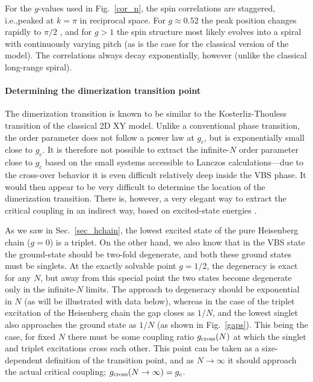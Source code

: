 \documentclass[draft,numberedheadings]{aipproc}
\begin{document}
For the $g$-values used in Fig.~\ref{cor_n}, the spin correlations are staggered, i.e.,peaked at $k=\pi$ in reciprocal space. For $g \approx 0.52$ 
the peak position changes rapidly to $\pi/2$ \cite{bursill96}, and for $g>1$ the spin structure most likely evolves into a spiral with continuously 
varying pitch \cite{kumar} (as is the case for the classical version of the model). The correlations always decay exponentially, however (unlike the
classical long-range spiral).


\paragraph{Determining the dimerization transition point}

The dimerization transition is known to be similar to the Kosterliz-Thouless transition of the classical 2D XY model. Unlike a conventional phase transition, 
the order parameter does not follow a power law at $g_c$, but is exponentially small close to $g_c$. It is therefore not possible to extract the infinite-$N$ 
order parameter close to $g_c$ based on the small systems accessible to Lanczos calculations---due to the cross-over behavior it is even difficult relatively 
deep inside the VBS phase. It would then appear to be very difficult to determine the location of the dimerization transition. There is, however, a very 
elegant way to extract the critical coupling in an indirect way, based on excited-state energies \cite{nomura92}.

As we saw in Sec.~\ref{sec_hchain}, the lowest excited state of the pure Heisenberg chain ($g=0$) is a triplet. On the other hand, we also know that in the VBS 
state the ground-state should be two-fold degenerate, and both these ground states must be singlets. At the exactly solvable point $g=1/2$, the degeneracy is 
exact for any $N$, but away from this special point the two states become degenerate only in the infinite-$N$ limits. The approach 
to degeneracy should be exponential in $N$ (as will be illustrated with data below), whereas in the case of the triplet excitation of the Heisenberg chain 
the gap closes as $1/N$, and the lowest singlet also approaches the ground state as $1/N$ (as shown in Fig.~\ref{gaps}). This being the case, for fixed $N$ there 
must be some coupling ratio $g_{\rm cross}(N)$ at which the singlet and triplet excitations cross each other. This point can be taken as a size-dependent definition 
of the transition point, and as $N \to \infty$ it should approach the actual critical coupling; $g_{\rm cross}(N \to \infty)=g_c$.
\end{document}
